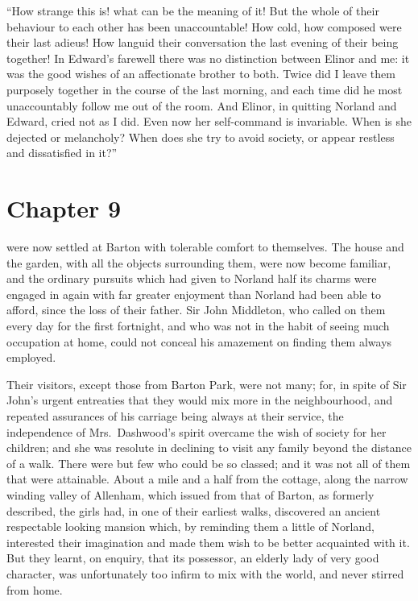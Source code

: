 ``How strange this is! what can be the meaning of it!
But the whole of their behaviour to each other has been
unaccountable! How cold, how composed were their last
adieus! How languid their conversation the last evening
of their being together! In Edward's farewell there was no
distinction between Elinor and me: it was the good wishes
of an affectionate brother to both.  Twice did I leave
them purposely together in the course of the last morning,
and each time did he most unaccountably follow me out
of the room.  And Elinor, in quitting Norland and Edward,
cried not as I did.  Even now her self-command is invariable.
When is she dejected or melancholy? When does she try
to avoid society, or appear restless and dissatisfied
in it?''



\chapter{Chapter 9}


 were now settled at Barton with tolerable
comfort to themselves.  The house and the garden, with all
the objects surrounding them, were now become familiar,
and the ordinary pursuits which had given to Norland
half its charms were engaged in again with far greater
enjoyment than Norland had been able to afford, since the
loss of their father.  Sir John Middleton, who called
on them every day for the first fortnight, and who was
not in the habit of seeing much occupation at home,
could not conceal his amazement on finding them always employed.

Their visitors, except those from Barton Park,
were not many; for, in spite of Sir John's urgent entreaties
that they would mix more in the neighbourhood, and repeated
assurances of his carriage being always at their service,
the independence of Mrs.\ Dashwood's spirit overcame the
wish of society for her children; and she was resolute
in declining to visit any family beyond the distance
of a walk.  There were but few who could be so classed;
and it was not all of them that were attainable.
About a mile and a half from the cottage, along the narrow
winding valley of Allenham, which issued from that of Barton,
as formerly described, the girls had, in one of their
earliest walks, discovered an ancient respectable looking
mansion which, by reminding them a little of Norland,
interested their imagination and made them wish to be
better acquainted with it.  But they learnt, on enquiry,
that its possessor, an elderly lady of very good character,
was unfortunately too infirm to mix with the world,
and never stirred from home.

